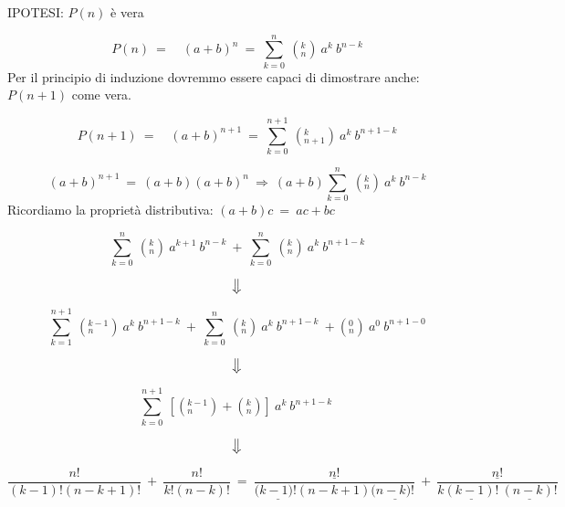 \begin{dimo}
IPOTESI: $P(n)$ è vera
	
	\begin{equation}
	P(n)\ =\quad (a+b)^n\ =\ \sum_{k=0}^{n}\ (_{n}^{k})\ a^k\ b^{n-k}
	\end{equation}
Per il principio di induzione dovremmo essere capaci di dimostrare anche: 
$P(n+1)$ come vera.

	\begin{equation}
	P(n+1)\ =\quad (a+b)^{n+1}\ =\ 
	\sum_{k=0}^{n+1}\ (_{n+1}^{k})\ a^k\ b^{n+1-k} 
	\end{equation}

	\begin{equation}
	(a+b)^{n+1}\ =\ (a+b)(a+b)^n\ \Rightarrow\ 
	(a+b)\sum_{k=0}^{n}\ (_{n}^{k})\ a^k\ b^{n-k}
	\end{equation}
Ricordiamo la proprietà distributiva: $(a+b)c\ =\ ac + bc$

	\begin{equation}
	\sum_{k=0}^{n}\ (_{n}^{k})\ a^{k+1}\ b^{n-k}\ +\ 
	\sum_{k=0}^{n}\ (_{n}^{k})\ a^k\ b^{n+1-k}
	\end{equation}

	\begin{equation*} 
	\big\Downarrow
	\end{equation*}

	\begin{equation}
	\sum_{k=1}^{n+1}\ (_{n}^{k-1})\ a^{k}\ b^{n+1-k}\ + \ 
	\sum_{k=0}^{n}\ (_{n}^{k})\ a^k\ b^{n+1-k}\ + (_{n}^{0})\ a^0\ b^{n+1-0}
	\end{equation}

	\begin{equation*} 
	\big\Downarrow
	\end{equation*}
	
	\begin{equation}
	\sum_{k=0}^{n+1}\ [(_{n}^{k-1}) + (_{n}^{k})]\ a^{k}\ b^{n+1-k}\
	\end{equation}
	
	\begin{equation*}
	\big\Downarrow
	\end{equation*}
	
	\begin{equation}
	\frac{n!}{(k-1)!(n-k+1)!}\ +\ \frac{n!}{k!(n-k)!}\ =\
	\frac{\underline{n!}}{(\underline{k-1)!}(n-k+1)(\underline{n-k)!}}\ +\ 
	\frac{\underline{n!}}{k\underline{(k-1)!}\ \underline{(n-k)!}}
	\end{equation}
			

\end{dimo}
